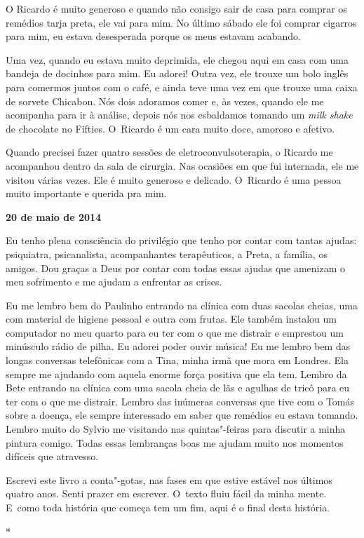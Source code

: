 O Ricardo é muito generoso e quando não consigo sair de casa para
comprar os remédios tarja preta, ele vai para mim. No último sábado ele
foi comprar cigarros para mim, eu estava desesperada porque os meus
estavam acabando.

Uma vez, quando eu estava muito deprimida, ele chegou aqui em casa com
uma bandeja de docinhos para mim. Eu adorei! Outra vez, ele trouxe um
bolo inglês para comermos juntos com o café, e ainda teve uma vez em que
trouxe uma caixa de sorvete Chicabon. Nós dois adoramos comer e, às
vezes, quando ele me acompanha para ir à análise, depois nós nos
esbaldamos tomando um \emph{milk shake} de chocolate no Fifties. O~Ricardo é um cara muito doce, amoroso e afetivo.

Quando precisei fazer quatro sessões de eletroconvulsoterapia, o Ricardo
me acompanhou dentro da sala de cirurgia. Nas ocasiões em que fui
internada, ele me visitou várias vezes. Ele é muito generoso e delicado.
O~Ricardo é uma pessoa muito importante e querida pra mim.

\begin{center}\asterisc{}\end{center}

\begin{flushright}\textbf{20 de maio de 2014}\end{flushright}


Eu tenho plena consciência do privilégio que tenho por contar com tantas
ajudas: psiquiatra, psicanalista, acompanhantes terapêuticos, a Preta, a
família, os amigos. Dou graças a Deus por contar com todas essas ajudas
que amenizam o meu sofrimento e me ajudam a enfrentar as crises.

Eu me lembro bem do Paulinho entrando na clínica com duas sacolas
cheias, uma com material de higiene pessoal e outra com frutas. Ele
também instalou um computador no meu quarto para eu ter com o que me
distrair e emprestou um minúsculo rádio de pilha. Eu adorei poder ouvir
música! Eu me lembro bem das longas conversas telefônicas com a Tina,
minha irmã que mora em Londres. Ela sempre me ajudando com aquela enorme
força positiva que ela tem. Lembro da Bete entrando na clínica com uma
sacola cheia de lãs e agulhas de tricô para eu ter com o que me
distrair. Lembro das inúmeras conversas que tive com o Tomás sobre a
doença, ele sempre interessado em saber que remédios eu estava tomando.
Lembro muito do Sylvio me visitando nas quintas"-feiras para discutir a
minha pintura comigo. Todas essas lembranças boas me ajudam muito nos
momentos difíceis que atravesso.

Escrevi este livro a conta"-gotas, nas fases em que estive estável nos
últimos quatro anos. Senti prazer em escrever. O~texto fluiu fácil da
minha mente. E~como toda história que começa tem um fim, aqui é o final
desta história.

\begin{center}*\end{center}



